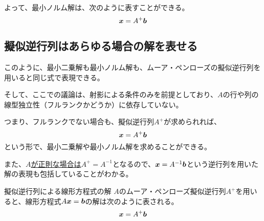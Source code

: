 \documentclass[../../../topic_linear-algebra]{subfiles}
\begin{document}
よって、最小ノルム解は、次のように表すことができる。
\begin{equation*}
  \vb*{x} = A^+ \vb*{b}
\end{equation*}

\subsection{擬似逆行列はあらゆる場合の解を表せる}

このように、最小二乗解も最小ノルム解も、ムーア・ペンローズの擬似逆行列を用いると同じ式で表現できる。

そして、ここでの議論は、射影による条件のみを前提としており、$A$の行や列の線型独立性（フルランクかどうか）に依存していない。

\br

つまり、フルランクでない場合も、擬似逆行列$A^+$が求められれば、
\begin{equation*}
  \vb*{x} = A^+ \vb*{b}
\end{equation*}
という形で、最小二乗解や最小ノルム解を求めることができる。

\br

また、\hyperref[thm:pseudoinverse-of-invertible]{$A$が正則な場合は$A^+ = A^{-1}$}となるので、$\vb*{x} = A^{-1} \vb*{b}$という逆行列を用いた解の表現も包括していることがわかる。

\begin{theorem*}{擬似逆行列による線形方程式の解}
  $A$のムーア・ペンローズ擬似逆行列$A^+$を用いると、線形方程式$A\vb*{x} = \vb*{b}$の解は次のように表される。
  \begin{equation*}
    \vb*{x} = A^+ \vb*{b}
  \end{equation*}
\end{theorem*}
\end{document}
